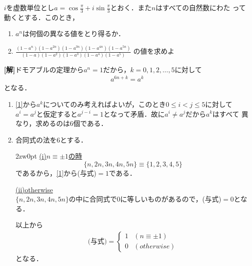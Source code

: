 \documentclass[a4j]{jarticle}
\begin{document}

     \begin{oframed}
     $i$を虚数単位とし$a=\cos\frac{\pi}{3}+i\sin\frac{\pi}{3}$とおく．また$n$はすべての自然数にわた
     って動くとする．このとき，
         \begin{enumerate}[(1)]
         \item $a^n$は何個の異なる値をとり得るか．
         \item $\frac{(1-a^n)(1-a^{2n})(1-a^{3n})(1-a^{4n})(1-a^{5n})}{(1-a)(1-a^2)(1-a^3)(1-a^4)(1-a^5)}$
         の値を求めよ
         \end{enumerate}
     \end{oframed}

\setlength{\columnseprule}{0.4pt}
\begin{multicols}{2}
{\bf[解]}ドモアブルの定理から$a^n=1$だから，$k=0,1,2,\dots,5$に対して
     \begin{align}
     a^{6n+k}=a^k\label{1}
     \end{align}
となる．
     \begin{enumerate}[(1)]
     \item \eqref{1}から$a^k$についてのみ考えればよいが，このとき$0\le i<j\le5$に対して
     $a^i=a^j$と仮定すると$a^{j-i}=1$となって矛盾．故に$a^i\not=a^j$だから$a^k$はすべて
     異なり，求めるのは$6$個である．
     \item 合同式の法を$6$とする．
          \begin{indentation}{2zw}{0pt}
          \noindent\underline{(i)$n\equiv \pm1$の時} 
          \[\{n,2n,3n,4n,5n\}\equiv\{1,2,3,4,5\}\]
         であるから，\eqref{1}から(与式)$=1$である．
         
         \underline{(ii)otherwise}　\\
         $\{n,2n,3n,4n,5n\}$の中に合同式で$0$に等しいものがあるので，(与式)$=0$となる．
         \end{indentation}
    以上から
         \begin{align*}
         \text{(与式)}=\left\{
              \begin{array}{ll}
              1 &  (n\equiv \pm1)     \\
              0 &  (otherwise)
              \end{array}
         \right.\tag{答}
         \end{align*}
    となる．     
    \end{enumerate}
\newpage
\end{multicols}
\end{document}
